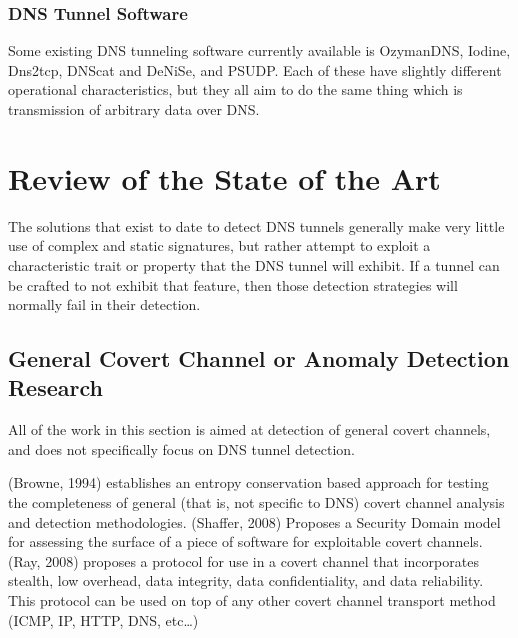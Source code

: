 \documentclass{llncs}
\begin{document}
\subsubsection{DNS Tunnel Software}
\label{tunnels-existing}
Some existing DNS tunneling software currently available is OzymanDNS\cite{ozymandnssrc},
Iodine\cite{iodinesrc}, Dns2tcp\cite{dns2tcpsrc}, DNScat\cite{dnscatsrc} and
DeNiSe\cite{denisesrc}, and PSUDP\cite{psudpsrc}. Each of these have slightly
different operational characteristics, but they all aim to do the same thing
which is transmission of arbitrary data over DNS.

\section{Review of the State of the Art}
\label{litreview}
The solutions that exist to date to detect DNS tunnels generally make very
little use of complex and static signatures, but rather attempt to exploit a
characteristic trait or property that the DNS tunnel will exhibit. If a tunnel
can be crafted to not exhibit that feature, then those detection strategies will
normally fail in their detection.

\subsection{General Covert Channel or Anomaly Detection Research}

All of the work in this section is aimed at detection of general covert
channels, and does not specifically focus on DNS tunnel detection.

(Browne, 1994)\cite{Browne1994} establishes an entropy conservation based
approach for testing the completeness of general (that is, not specific to DNS)
covert channel analysis and detection methodologies. (Shaffer,
2008)\cite{Shaffer2008} Proposes a Security Domain model for assessing the
surface of a piece of software for exploitable covert channels. (Ray,
2008)\cite{Ray2008} proposes a protocol for use in a covert channel that
incorporates stealth, low overhead, data integrity, data confidentiality, and
data reliability. This protocol can be used on top of any other covert channel
transport method (ICMP, IP, HTTP, DNS, etc\ldots)
\end{document}
